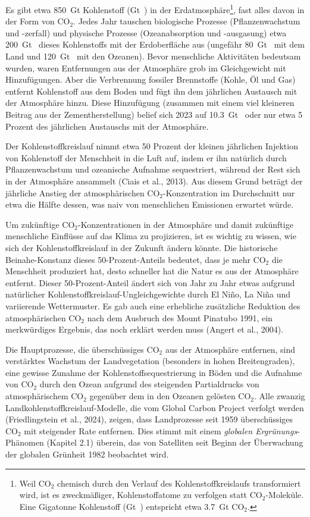 \documentclass[12pt,paper=a4,DIV=12,parskip=never,chapterprefix=false,headings=standardclasses]{scrreprt}
\numberwithin{figure}{chapter}
\begin{document}
Es gibt etwa \SI{850}{\giga\tonne} Kohlenstoff (\si{\giga\tonne{}}) in der Erdatmosphäre\footnote{Weil CO$_2$ chemisch durch den Verlauf des Kohlenstoffkreislaufs transformiert wird, ist es zweckmäßiger, Kohlenstoffatome zu verfolgen statt CO$_2$-Moleküle. Eine Gigatonne Kohlenstoff (\si{\giga\tonne{}}) entspricht etwa \SI{3.7}{\giga\tonne} CO$_2$.}, fast alles davon in der Form von CO$_2$. Jedes Jahr tauschen biologische Prozesse (Pflanzenwachstum und -zerfall) und physische Prozesse (Ozeanabsorption und -ausgasung) etwa \SI{200}{\giga\tonne{}} dieses Kohlenstoffs mit der Erdoberfläche aus (ungefähr \SI{80}{\giga\tonne{}} mit dem Land und \SI{120}{\giga\tonne{}} mit den Ozeanen). Bevor menschliche Aktivitäten bedeutsam wurden, waren Entfernungen aus der Atmosphäre grob im Gleichgewicht mit Hinzufügungen. Aber die Verbrennung fossiler Brennstoffe (Kohle, Öl und Gas) entfernt Kohlenstoff aus dem Boden und fügt ihn dem jährlichen Austausch mit der Atmosphäre hinzu. Diese Hinzufügung (zusammen mit einem viel kleineren Beitrag aus der Zementherstellung) belief sich 2023 auf \SI{10.3}{\giga\tonne{}} oder nur etwa 5 Prozent des jährlichen Austauschs mit der Atmosphäre.

Der Kohlenstoffkreislauf nimmt etwa 50 Prozent der kleinen jährlichen Injektion von Kohlenstoff der Menschheit in die Luft auf, indem er ihn natürlich durch Pflanzenwachstum und ozeanische Aufnahme sequestriert, während der Rest sich in der Atmosphäre ansammelt (Ciais et al., 2013). Aus diesem Grund beträgt der jährliche Anstieg der atmosphärischen CO$_2$-Konzentration im Durchschnitt nur etwa die Hälfte dessen, was naiv von menschlichen Emissionen erwartet würde.

Um zukünftige CO$_2$-Konzentrationen in der Atmosphäre und damit zukünftige menschliche Einflüsse auf das Klima zu projizieren, ist es wichtig zu wissen, wie sich der Kohlenstoffkreislauf in der Zukunft ändern könnte. Die historische Beinahe-Konstanz dieses 50-Prozent-Anteils bedeutet, dass je mehr CO$_2$ die Menschheit produziert hat, desto schneller hat die Natur es aus der Atmosphäre entfernt. Dieser 50-Prozent-Anteil ändert sich von Jahr zu Jahr etwas aufgrund natürlicher Kohlenstoffkreislauf-Ungleichgewichte durch El Ni\~no, La Ni\~na und variierende Wettermuster. Es gab auch eine erhebliche zusätzliche Reduktion des atmosphärischen CO$_2$ nach dem Ausbruch des Mount Pinatubo 1991, ein merkwürdiges Ergebnis, das noch erklärt werden muss (Angert et al., 2004).

Die Hauptprozesse, die überschüssiges CO$_2$ aus der Atmosphäre entfernen, sind verstärktes Wachstum der Landvegetation (besonders in hohen Breitengraden), eine gewisse Zunahme der Kohlenstoffsequestrierung in Böden und die Aufnahme von CO$_2$ durch den Ozean aufgrund des steigenden Partialdrucks von atmosphärischem CO$_2$ gegenüber dem in den Ozeanen gelösten CO$_2$. Alle zwanzig Landkohlenstoffkreislauf-Modelle, die vom Global Carbon Project verfolgt werden (Friedlingstein et al., 2024), zeigen, dass Landprozesse seit 1959 überschüssiges CO$_2$ mit steigender Rate entfernen. Dies stimmt mit einem \emph{globalen Ergrünungs}-Phänomen (Kapitel 2.1) überein, das von Satelliten seit Beginn der Überwachung der globalen Grünheit 1982 beobachtet wird.
\end{document}
